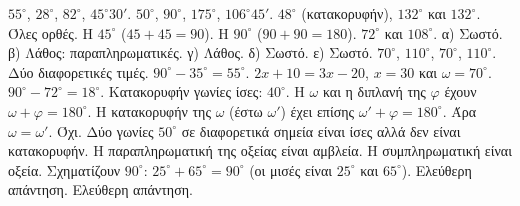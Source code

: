  $55^\circ$, $28^\circ$, $82^\circ$, $45^\circ30'$.
 $50^\circ$, $90^\circ$, $175^\circ$, $106^\circ45'$.
 $48^\circ$ (κατακορυφήν), $132^\circ$ και $132^\circ$.
 Όλες ορθές.
 Η $45^\circ$ ($45+45=90$). Η $90^\circ$ ($90+90=180$).
 $72^\circ$ και $108^\circ$.
 α) Σωστό. β) Λάθος: παραπληρωματικές. γ) Λάθος. δ) Σωστό. ε) Σωστό.
 $70^\circ$, $110^\circ$, $70^\circ$, $110^\circ$. Δύο διαφορετικές τιμές.
 $90^\circ-35^\circ=55^\circ$.
 $2x+10=3x-20$, $x=30$ και $\omega=70^\circ$.
 $90^\circ-72^\circ=18^\circ$.
 Κατακορυφήν γωνίες ίσες: $40^\circ$.
 Η $\omega$ και η διπλανή της $\varphi$ έχουν $\omega+\varphi=180^\circ$. Η κατακορυφήν της $\omega$ (έστω $\omega'$) έχει επίσης $\omega'+\varphi=180^\circ$. Άρα $\omega=\omega'$.
 Όχι. Δύο γωνίες $50^\circ$ σε διαφορετικά σημεία είναι ίσες αλλά δεν είναι κατακορυφήν.
 Η παραπληρωματική της οξείας είναι αμβλεία. Η συμπληρωματική είναι οξεία.
 Σχηματίζουν $90^\circ$: $25^\circ+65^\circ=90^\circ$ (οι μισές είναι $25^\circ$ και $65^\circ$).
 Ελεύθερη απάντηση.
 Ελεύθερη απάντηση.
